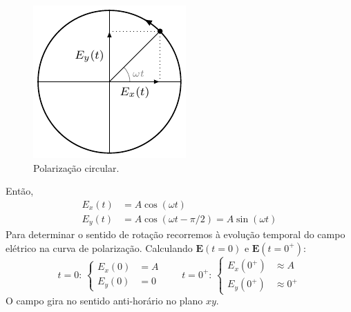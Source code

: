 \vspace{-0.75em}
\begin{minipage}[c]{0.3\linewidth}
    \begin{figure}[H]
        \centering
        \includegraphics[width=0.915\linewidth]{img/1/Circular-polarization.pdf}
        \caption{Polarização circular.}
    \end{figure}
\end{minipage}\hfil
\begin{minipage}[c]{0.65\linewidth}
    Então,
     \begin{equation*}
        \begin{aligned}
            E_{x}(t) &= A \cos(\omega t)\\
            E_{y}(t) &= A \cos(\omega t - \pi/2) = A \sin(\omega t)
        \end{aligned}
    \end{equation*}
    Para determinar o sentido de rotação recorremos à evolução temporal do campo elétrico na curva de polarização. Calculando $\mathbf{E}(t=0)$ e $\mathbf{E}(t=0^+)$:
    \begin{equation*}
        t = 0: \, \left\{
        \begin{aligned}
            E_{x}(0) &= A\\
            E_{y}(0) &= 0
        \end{aligned}\right.
        \qquad
        t = 0^+: \, \left\{
        \begin{aligned}
            E_{x}(0^+) &\approx A\\
            E_{y}(0^+) &\approx 0^+
        \end{aligned}\right.
    \end{equation*}
    O campo gira no sentido anti-horário no plano $xy$.
\end{minipage}

